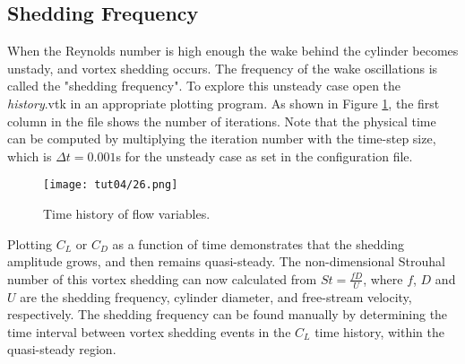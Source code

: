 \subsection{Shedding Frequency}
When the Reynolds number is high enough the wake behind the cylinder becomes unstady, and vortex shedding occurs. The frequency of the wake oscillations is called the "shedding frequency". To explore this unsteady case open the \textit{history}.vtk in an appropriate plotting program. As shown in Figure \ref{fig4:time_history}, the first column in the file shows the number of iterations. Note that the physical time can be computed by multiplying the iteration number with the time-step size, which is $\Delta t = 0.001$s for the unsteady case as set in the configuration file.
\begin{figure}[htbp]
    \centering
    \texttt{[image: tut04/26.png]}
    \caption{Time history of flow variables.}
    \label{fig4:time_history}
\end{figure}
Plotting $C_L$ or $C_D$ as a function of time demonstrates that the shedding amplitude grows, and then remains quasi-steady. The non-dimensional Strouhal number of this vortex shedding can now calculated from $St=\frac{f D}{U}$, where $f$, $D$ and $U$ are the shedding frequency, cylinder diameter, and free-stream velocity, respectively. The shedding frequency can be found manually by determining the time interval between vortex shedding events in the $C_L$ time history, within the quasi-steady region.
\clearpage
